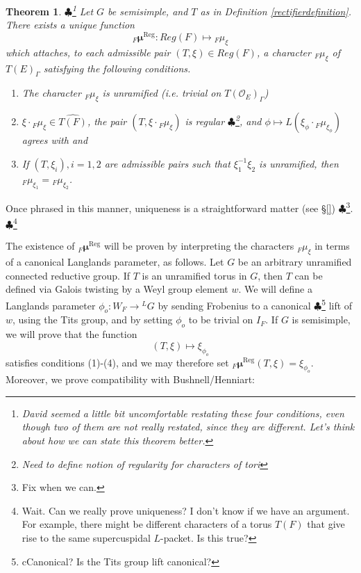 \documentclass[11pt]{amsart}
\theoremstyle{plain}
\newtheorem{theorem}{Theorem}[section]
\newcommand{\MAxxx}[1]{$\clubsuit$\footnote{#1}}
\theoremstyle{definition}
\begin{document}
\begin{theorem}\label{regularrectifierdefinition}\MAxxx{David seemed a little bit
uncomfortable restating these four conditions, even though two of them are not
really restated, since they are different.  Let's think about how we can
 state this theorem better.}
Let $G$ be semisimple, and $T$ as in Definition \ref{rectifierdefinition}.
There exists a unique function $${}_F
  \boldsymbol\mu^{\mathrm{Reg}} : Reg(F) \mapsto {}_F \mu_{\xi}$$ which attaches,
  to each admissible pair $(T, \xi) \in Reg(F)$, a character ${}_F
  \mu_{\xi}$ of $T(E)_{\Gamma}$ satisfying the following conditions.

\begin{enumerate}
\item The character ${}_F \mu_{\xi}$ is unramified (i.e. trivial on
  $T(\mathcal{O}_E)_{\Gamma}$)

\item $\xi \cdot {}_F \mu_{\xi} \in \widehat{T(F)}$, the pair
$(T, \xi \cdot {}_F \mu_{\xi})$ is regular \MAxxx{Need to define notion of
regularity for characters of tori}, and
$\phi \mapsto L(\xi_{\phi} \cdot {}_F \mu_{\xi_{\phi}})$
  agrees with \cite{debackerreeder} and \cite{reeder}

\item If $(T, \xi_i), i = 1,2$ are admissible pairs  such that
$\xi_1^{-1} \xi_2$ is unramified, then
${}_F \mu_{\xi_1} = {}_F \mu_{\xi_2}$.
\end{enumerate}
\end{theorem}

Once phrased in this manner, uniqueness is a straightforward matter
(see \S\ref{}) \MAxxx{Fix when we can.}. \MAxxx{Wait.  Can we really prove uniqueness?
I don't know if we have an argument.  For example, there might be different
characters of a torus $T(F)$ that give rise to the same supercuspidal $L$-packet.
Is this true?}

The existence of ${}_F  \boldsymbol\mu^{\mathrm{Reg}}$
will be proven by interpreting the characters ${}_F \mu_{\xi}$
in terms of a canonical Langlands parameter, as follows.  Let
$G$ be an arbitrary unramified connected reductive group.  If
$T$ is an unramified torus in $G$, then $T$ can be defined
via Galois twisting by a Weyl group element $w$.  We will define
a Langlands parameter $\phi_o :W _F \rightarrow {}^L G$ by
sending Frobenius to a canonical \MAxxx{cCanonical?  Is the Tits group
lift canonical?} lift of $w$, using the Tits group, and by setting
$\phi_o$ to be trivial on $I_F$.
If $G$ is semisimple,
we will prove that the function $$(T, \xi) \mapsto \xi_{\phi_o}$$
satisfies conditions (1)-(4), and we may therefore set
${}_F \boldsymbol\mu^{\mathrm{Reg}}(T,\xi) = \xi_{\phi_o}$.
Moreover, we prove compatibility with Bushnell/Henniart:
\end{document}
